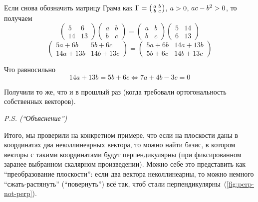 \documentclass[a4paper,12pt]{article}
\theoremstyle{remark}
\begin{document}
\begin{solution}
    Если снова обозначить матрицу Грама как $\Gamma \hm= \left(\begin{smallmatrix}a & b\\ b & c\end{smallmatrix}\right)$, $a \hm> 0$, $ac \hm- b^2 \hm> 0$, то получаем
    \[
      \begin{pmatrix}
        5 & 6\\
        14 & 13
      \end{pmatrix}
      \begin{pmatrix}
        a & b\\
        b & c
      \end{pmatrix}
      = \begin{pmatrix}
        a & b\\
        b & c
      \end{pmatrix}
      \begin{pmatrix}
        5 & 14\\
        6 & 13
      \end{pmatrix}
    \]
    \[
      \begin{pmatrix}
        5a + 6b & 5b + 6c\\
        14a + 13b & 14b + 13c
      \end{pmatrix}
      = \begin{pmatrix}
        5a + 6b & 14a + 13b\\
        5b + 6c & 14b + 13c
      \end{pmatrix}
    \]
    
    Что равносильно
    \[
      14a + 13b = 5b + 6c \Leftrightarrow 7 a + 4 b - 3 c = 0
    \]
    
    Получили то же, что и в прошлый раз (когда требовали ортогональность собственных векторов).
    
    \medskip
    
    \emph{P.S. (``Объяснение'')}
    
    Итого, мы проверили на конкретном примере, что если на плоскости даны в координатах два неколлинеарных вектора, то можно найти базис, в котором векторы с такими координатами будут перпендикулярны (при фиксированном заранее выбранном скалярном произведении).
    Можно себе это представить как ``преобразование плоскости'': если два вектора неколлинеарны, то можно немного ``сжать-растянуть'' (``повернуть'') всё так, чтоб стали перпендикулярны~(\ref{fig:perp-not-perp}).
        
    \begin{figure}
      \centering
      

\end{figure}
\end{solution}
\end{document}
